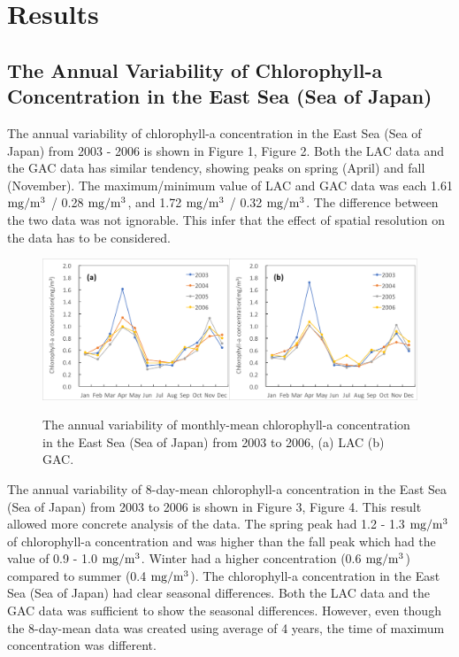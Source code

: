 
\section{Results}
 
\subsection{The Annual Variability of Chlorophyll-a Concentration in the East Sea (Sea of Japan)}
 
The annual variability of chlorophyll-a concentration in the East Sea (Sea of Japan) from 2003 - 2006 is shown in Figure 1, Figure 2. Both the LAC data and the GAC data has similar tendency, showing peaks on spring (April) and fall (November). The maximum/minimum value of LAC and GAC data was each 1.61 $\rm mg/m^3$ / 0.28 $\rm mg/m^3$, and 1.72 $\rm mg/m^3$ / 0.32 $\rm mg/m^3$. The difference between the two data was not ignorable. This infer that the effect of spatial resolution on the data has to be considered.
   
 \begin{figure}[b]
 	\centering
 	\includegraphics[width=1.0\linewidth]{../images/annualmon}\\
 	\caption{The annual variability of monthly-mean chlorophyll-a concentration in the East Sea (Sea of Japan) from 2003 to 2006, (a) LAC (b) GAC.}
 	\label{fig:annualmon}
 \end{figure}
 
The annual variability of 8-day-mean chlorophyll-a concentration in the East Sea (Sea of Japan) from 2003 to 2006 is shown in Figure 3, Figure 4. This result allowed more concrete analysis of the data. The spring peak had 1.2 - 1.3 $\rm mg/m^3$ of chlorophyll-a concentration and was higher than the fall peak which had the value of 0.9 - 1.0 $\rm mg/m^3$. Winter had a higher concentration (0.6 $\rm mg/m^3$) compared to summer (0.4 $\rm mg/m^3$). The chlorophyll-a concentration in the East Sea (Sea of Japan) had clear seasonal differences. Both the LAC data and the GAC data was sufficient to show the seasonal differences. However, even though the 8-day-mean data was created using average of 4 years, the time of maximum concentration was different. 

